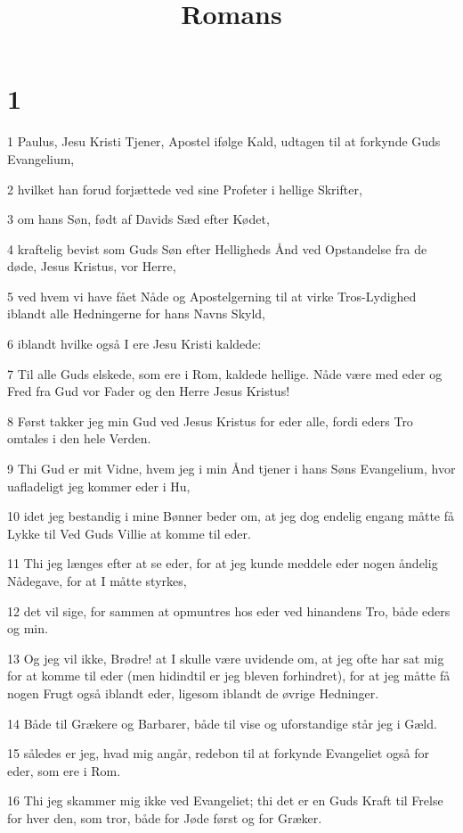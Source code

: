 

\title{Romans}


\chapter{1}

\par 1 Paulus, Jesu Kristi Tjener, Apostel ifølge Kald, udtagen til at forkynde Guds Evangelium,
\par 2 hvilket han forud forjættede ved sine Profeter i hellige Skrifter,
\par 3 om hans Søn, født af Davids Sæd efter Kødet,
\par 4 kraftelig bevist som Guds Søn efter Helligheds Ånd ved Opstandelse fra de døde, Jesus Kristus, vor Herre,
\par 5 ved hvem vi have fået Nåde og Apostelgerning til at virke Tros-Lydighed iblandt alle Hedningerne for hans Navns Skyld,
\par 6 iblandt hvilke også I ere Jesu Kristi kaldede:
\par 7 Til alle Guds elskede, som ere i Rom, kaldede hellige. Nåde være med eder og Fred fra Gud vor Fader og den Herre Jesus Kristus!
\par 8 Først takker jeg min Gud ved Jesus Kristus for eder alle, fordi eders Tro omtales i den hele Verden.
\par 9 Thi Gud er mit Vidne, hvem jeg i min Ånd tjener i hans Søns Evangelium, hvor uafladeligt jeg kommer eder i Hu,
\par 10 idet jeg bestandig i mine Bønner beder om, at jeg dog endelig engang måtte få Lykke til Ved Guds Villie at komme til eder.
\par 11 Thi jeg længes efter at se eder, for at jeg kunde meddele eder nogen åndelig Nådegave, for at I måtte styrkes,
\par 12 det vil sige, for sammen at opmuntres hos eder ved hinandens Tro, både eders og min.
\par 13 Og jeg vil ikke, Brødre! at I skulle være uvidende om, at jeg ofte har sat mig for at komme til eder (men hidindtil er jeg bleven forhindret), for at jeg måtte få nogen Frugt også iblandt eder, ligesom iblandt de øvrige Hedninger.
\par 14 Både til Grækere og Barbarer, både til vise og uforstandige står jeg i Gæld.
\par 15 således er jeg, hvad mig angår, redebon til at forkynde Evangeliet også for eder, som ere i Rom.
\par 16 Thi jeg skammer mig ikke ved Evangeliet; thi det er en Guds Kraft til Frelse for hver den, som tror, både for Jøde først og for Græker.
